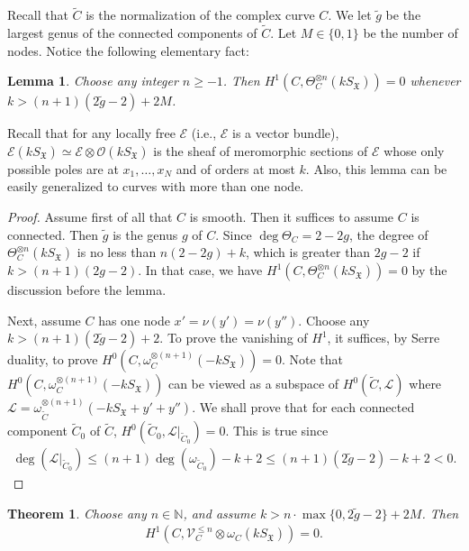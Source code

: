 \documentclass[12pt,a4paper,notitlepage]{article}
\theoremstyle{definition}
\theoremstyle{plain}
\newtheorem{thm}[df]{Theorem}
\newtheorem{lm}[df]{Lemma}
\newcommand{\fk}{\mathfrak}
\newcommand{\wtd}{\widetilde}
\newcommand{\scr}{\mathscr}
\newcommand{\SX}{S_{\fk X}}
\newcommand{\blt}{\bullet}
\newcommand{\Nbb}{\mathbb N}
\numberwithin{equation}{section}
\begin{document}
Recall that $\wtd C$ is the normalization of the complex curve $C$. We let $\wtd g$ be the largest genus of the connected components of $\wtd C$. Let $M\in\{0,1\}$ be the number of nodes. Notice the following elementary fact:

\begin{lm}\label{lb4}
Choose any integer $n\geq -1$. Then $H^1(C,\Theta_C^{\otimes n}(k\SX))=0$ whenever  $k>(n+1)(2\wtd g-2)+2M$.
\end{lm} 

Recall that for any locally free $\scr E$ (i.e., $\scr E$ is a vector bundle), \index{SX@$k\SX,\blt\SX$} $\scr E(k\SX)\simeq\scr E\otimes\scr O(k\SX)$ is the sheaf of meromorphic sections of $\scr E$ whose only possible poles are at $x_1,\dots,x_N$ and of orders at most $k$. Also, this lemma can be easily generalized to curves with more than one node.

\begin{proof}
Assume first of all that $C$ is smooth. Then it suffices to assume $C$ is connected. Then $\wtd g$ is the genus $g$ of $C$. Since $\deg\Theta_C=2-2g$, the degree of $\Theta_C^{\otimes n}(k\SX)$ is no less than $n(2-2g)+k$, which is greater than $2g-2$ if $k>(n+1)(2g-2)$. In that case, we have $H^1(C,\Theta_C^{\otimes n}(k\SX))=0$ by the discussion before the lemma.

Next, assume $C$ has one node $x'=\nu(y')=\nu(y'')$. Choose any $k>(n+1)(2\wtd g-2)+2$. To prove the vanishing of $H^1$, it suffices, by Serre duality, to prove $H^0(C,\omega_C^{\otimes(n+1)}(-k\SX))=0$. Note that $H^0(C,\omega_C^{\otimes(n+1)}(-k\SX))$ can be viewed as a subspace of $H^0(\wtd C,\scr L)$ where $\scr L=\omega_{\wtd C}^{\otimes(n+1)}(-k\SX+y'+y'')$. We shall prove that for each connected component $\wtd C_0$ of $\wtd C$, $H^0(\wtd C_0,\scr L|_{\wtd C_0})=0$. This is true since
\begin{align*}
\deg(\scr L|_{\wtd C_0})\leq (n+1)\deg(\omega_{\wtd C_0})-k+2\leq (n+1)(2\wtd g-2)-k+2<0.
\end{align*}
\end{proof}



\begin{thm}\label{lb9}
Choose any $n\in\Nbb$, and assume $k>n\cdot\max\{0,2\wtd g-2\}+2M$. Then
\begin{align*}
H^1(C,\scr V_C^{\leq n}\otimes\omega_C(k\SX))=0.
\end{align*}
\end{thm}
\end{document}
